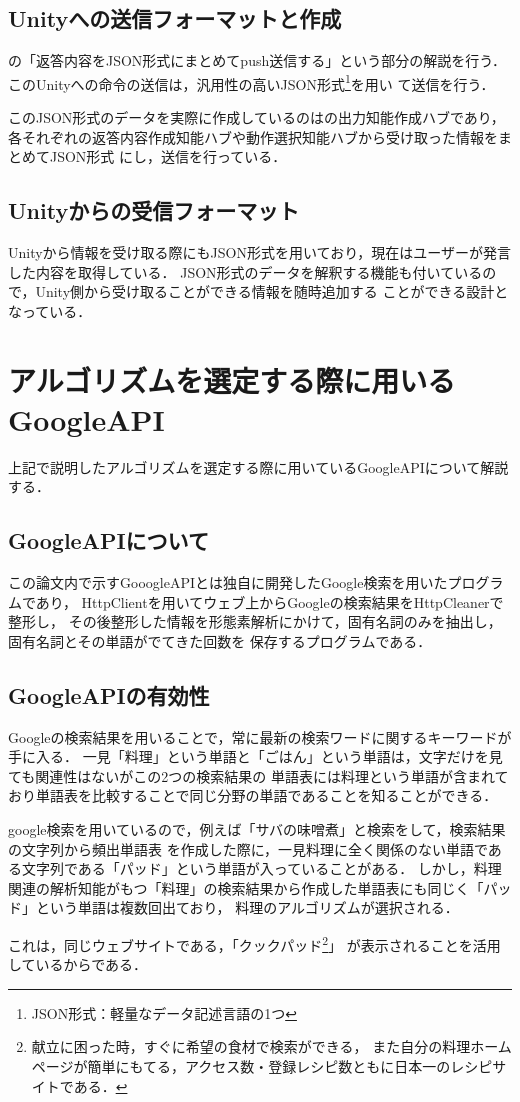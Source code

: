 \subsection{Unityへの送信フォーマットと作成}
の「返答内容をJSON形式にまとめてpush送信する」という部分の解説を行う．
このUnityへの命令の送信は，汎用性の高いJSON形式\footnote{JSON形式：軽量なデータ記述言語の1つ}を用い
て送信を行う．

このJSON形式のデータを実際に作成しているのはの出力知能作成ハブであり，
各それぞれの返答内容作成知能ハブや動作選択知能ハブから受け取った情報をまとめてJSON形式
にし，送信を行っている．

\subsection{Unityからの受信フォーマット}
Unityから情報を受け取る際にもJSON形式を用いており，現在はユーザーが発言した内容を取得している．
JSON形式のデータを解釈する機能も付いているので，Unity側から受け取ることができる情報を随時追加する
ことができる設計となっている．
\newpage
\section{アルゴリズムを選定する際に用いるGoogleAPI}
上記で説明したアルゴリズムを選定する際に用いているGoogleAPIについて解説する．

\subsection{GoogleAPIについて}
この論文内で示すGooogleAPIとは独自に開発したGoogle検索を用いたプログラムであり，
HttpClientを用いてウェブ上からGoogleの検索結果をHttpCleanerで整形し，
その後整形した情報を形態素解析にかけて，固有名詞のみを抽出し，固有名詞とその単語がでてきた回数を
保存するプログラムである．

\subsection{GoogleAPIの有効性}
Googleの検索結果を用いることで，常に最新の検索ワードに関するキーワードが手に入る．
一見「料理」という単語と「ごはん」という単語は，文字だけを見ても関連性はないがこの2つの検索結果の
単語表には料理という単語が含まれており単語表を比較することで同じ分野の単語であることを知ることができる．

google検索を用いているので，例えば「サバの味噌煮」と検索をして，検索結果の文字列から頻出単語表
を作成した際に，一見料理に全く関係のない単語である文字列である「パッド」という単語が入っていることがある．
しかし，料理関連の解析知能がもつ「料理」の検索結果から作成した単語表にも同じく「パッド」という単語は複数回出ており，
料理のアルゴリズムが選択される．

これは，同じウェブサイトである，「クックパッド\footnote{献立に困った時，すぐに希望の食材で検索ができる，
また自分の料理ホームページが簡単にもてる，アクセス数・登録レシピ数ともに日本一のレシピサイトである．}」
が表示されることを活用しているからである．
